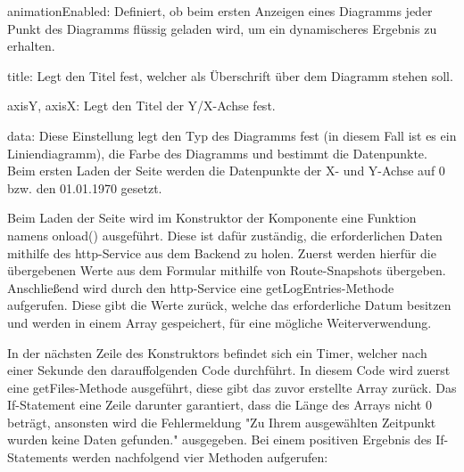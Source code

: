 \begin{compactitem}
\item animationEnabled: Definiert, ob beim ersten Anzeigen eines Diagramms jeder Punkt des Diagramms flüssig geladen wird, um ein dynamischeres Ergebnis zu erhalten.
\item title: Legt den Titel fest, welcher als Überschrift über dem Diagramm stehen soll.
\item axisY, axisX: Legt den Titel der Y/X-Achse fest.
\item data: Diese Einstellung legt den Typ des Diagramms fest (in diesem Fall ist es ein Liniendiagramm), die Farbe des Diagramms und bestimmt die Datenpunkte. Beim ersten Laden der Seite werden die Datenpunkte der X- und Y-Achse auf 0 bzw. den 01.01.1970 gesetzt.
\end{compactitem}




Beim Laden der Seite wird im Konstruktor der Komponente eine Funktion namens onload() ausgeführt. Diese ist dafür zuständig, die erforderlichen Daten mithilfe des http-Service aus dem Backend zu holen. Zuerst werden hierfür die übergebenen Werte aus dem Formular mithilfe von Route-Snapshots übergeben. Anschließend wird durch den http-Service eine getLogEntries-Methode aufgerufen. Diese gibt die Werte zurück, welche das erforderliche Datum besitzen und werden in einem Array gespeichert, für eine mögliche Weiterverwendung.


In der nächsten Zeile des Konstruktors befindet sich ein Timer, welcher nach einer Sekunde den darauffolgenden Code durchführt. In diesem Code wird zuerst eine getFiles-Methode ausgeführt, diese gibt das zuvor erstellte Array zurück. Das If-Statement eine Zeile darunter garantiert, dass die Länge des Arrays nicht 0 beträgt, ansonsten wird die Fehlermeldung "Zu Ihrem ausgewählten Zeitpunkt wurden keine Daten gefunden." ausgegeben. Bei einem positiven Ergebnis des If-Statements werden nachfolgend vier Methoden aufgerufen:


